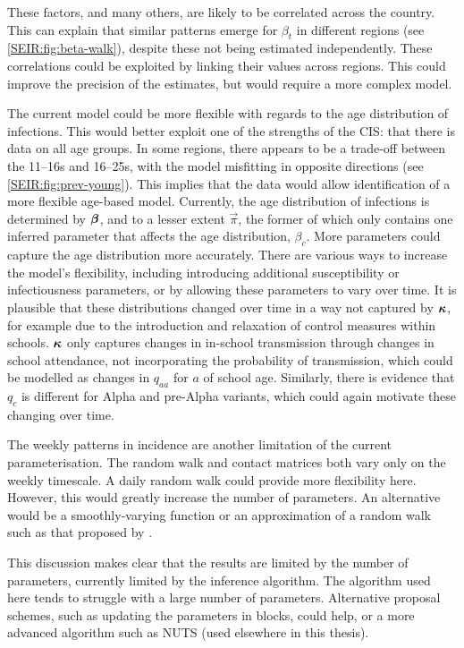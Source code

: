 \documentclass[thesis.tex]{subfiles}
\begin{document}
These factors, and many others, are likely to be correlated across the country.
This can explain that similar patterns emerge for $\beta_t$ in different regions (see \cref{SEIR:fig:beta-walk}), despite these not being estimated independently.
These correlations could be exploited by linking their values across regions.
This could improve the precision of the estimates, but would require a more complex model.


The current model could be more flexible with regards to the age distribution of infections.
This would better exploit one of the strengths of the CIS: that there is data on all age groups.
In some regions, there appears to be a trade-off between the 11--16s and 16--25s, with the model misfitting in opposite directions (see \cref{SEIR:fig:prev-young}).
This implies that the data would allow identification of a more flexible age-based model.
Currently, the age distribution of infections is determined by $\bm{\beta}$, and to a lesser extent $\vec{\pi}$, the former of which only contains one inferred parameter that affects the age distribution, $\beta_c$.
More parameters could capture the age distribution more accurately.
There are various ways to increase the model's flexibility, including introducing additional susceptibility or infectiousness parameters, or by allowing these parameters to vary over time.
It is plausible that these distributions changed over time in a way not captured by $\bm{\kappa}$, for example due to the introduction and relaxation of control measures within schools.
$\bm{\kappa}$ only captures changes in in-school transmission through changes in school attendance, not incorporating the probability of transmission, which could be modelled as changes in $q_{aa}$ for $a$ of school age.
Similarly, there is evidence that $q_c$ is different for Alpha and pre-Alpha variants, which could again motivate these changing over time.

The weekly patterns in incidence are another limitation of the current parameterisation.
The random walk and contact matrices both vary only on the weekly timescale.
A daily random walk could provide more flexibility here.
However, this would greatly increase the number of parameters.
An alternative would be a smoothly-varying function or an approximation of a random walk such as that proposed by \textcite{ghoshApproximate}.

This discussion makes clear that the results are limited by the number of parameters, currently limited by the inference algorithm.
The algorithm used here tends to struggle with a large number of parameters.
Alternative proposal schemes, such as updating the parameters in blocks, could help, or a more advanced algorithm such as NUTS (used elsewhere in this thesis).
\end{document}
